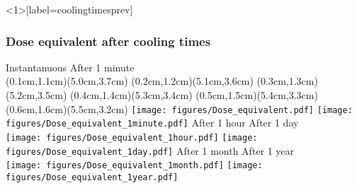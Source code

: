 \documentclass[xcolor={dvipsnames}]{beamer}
\begin{document}
\begin{frame}<1>[label=coolingtimesprev]
  \frametitle<1>{Dose equivalent after cooling times}
  \centering
  \hspace*{1.6cm} Instantanuous \hfill After 1 minute \hspace*{1.8cm} \\
  (0.1cm,1.1cm)(5.0cm,3.7cm)                                                                                                                                                                                                
  (0.2cm,1.2cm)(5.1cm,3.6cm)                                                                                                                                                                                                
  (0.3cm,1.3cm)(5.2cm,3.5cm)                                                                                                                                                                                                
  (0.4cm,1.4cm)(5.3cm,3.4cm)                                                                                                                                                                                                
  (0.5cm,1.5cm)(5.4cm,3.3cm)                                                                                                                                                                                                
  (0.6cm,1.6cm)(5.5cm,3.2cm)                                                                                                                                                                                                
  \texttt{[image: figures/Dose\_equivalent.pdf]}
  \texttt{[image: figures/Dose\_equivalent\_1minute.pdf]}
  \hspace*{1.6cm} After 1 hour \hfill After 1 day \hspace*{1.8cm} \\
  \texttt{[image: figures/Dose\_equivalent\_1hour.pdf]}
  \texttt{[image: figures/Dose\_equivalent\_1day.pdf]}
  \hspace*{1.6cm} After 1 month \hfill After 1 year \hspace*{1.8cm} \\
  \texttt{[image: figures/Dose\_equivalent\_1month.pdf]}
  \texttt{[image: figures/Dose\_equivalent\_1year.pdf]}
\end{frame}
\end{document}
